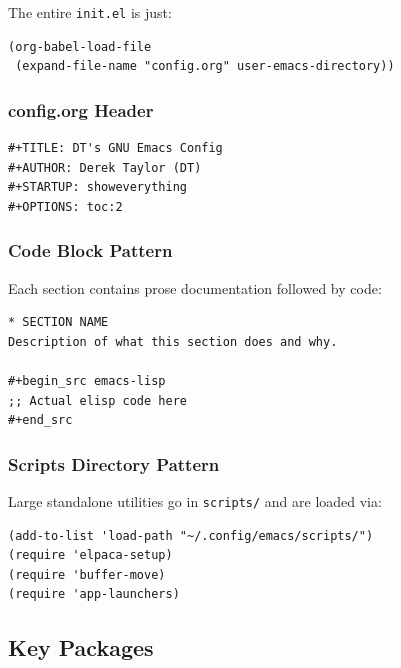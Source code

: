 \documentclass[11pt]{article}
\begin{document}
The entire \texttt{init.el} is just:

\begin{verbatim}
(org-babel-load-file
 (expand-file-name "config.org" user-emacs-directory))
\end{verbatim}
\subsubsection{config.org Header}
\label{sec:orgd861def}

\begin{verbatim}
#+TITLE: DT's GNU Emacs Config
#+AUTHOR: Derek Taylor (DT)
#+STARTUP: showeverything
#+OPTIONS: toc:2
\end{verbatim}
\subsubsection{Code Block Pattern}
\label{sec:orge3849a6}

Each section contains prose documentation followed by code:

\begin{verbatim}
* SECTION NAME
Description of what this section does and why.

#+begin_src emacs-lisp
;; Actual elisp code here
#+end_src
\end{verbatim}
\subsubsection{Scripts Directory Pattern}
\label{sec:org16114f0}

Large standalone utilities go in \texttt{scripts/} and are loaded via:

\begin{verbatim}
(add-to-list 'load-path "~/.config/emacs/scripts/")
(require 'elpaca-setup)
(require 'buffer-move)
(require 'app-launchers)
\end{verbatim}
\subsection{Key Packages}
\label{sec:org218f059}
\end{document}
